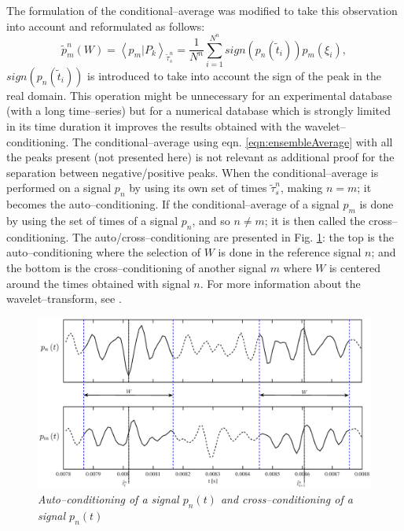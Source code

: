 The formulation of the conditional--average was modified to take this observation into account and reformulated as follows:
\begin{equation} \label{eqn:condAvgSign}
\tilde{p}_{m}^n\left( W \right) = \left< p_{m} | P_{k} \right>_{\tilde{\tau}^n_{s}} = \frac{1}{N^n} \sum^{N^n}_{i = 1} sign\left( p_{n} \left( \tilde{t}_{i} \right) \right) p_{m} \left( \xi_{i} \right),
\end{equation}
$sign\left( p_{n} \left( \tilde{t}_{i} \right) \right)$ is introduced to take into account the sign of the peak in the real domain. This operation might be unnecessary for an experimental database (with a long time--series) but for a numerical database which is strongly limited in its time duration it improves the results obtained with the wavelet--conditioning.
The conditional--average using eqn. \ref{eqn:ensembleAverage} with all the peaks present (not presented here) is not relevant as additional proof for the separation between negative/positive peaks.
When the conditional--average is performed on a signal $p_{n}$ by using its own set of times ${\tilde{\tau}^n_{s}}$, making $n = m$; it becomes the auto--conditioning. If the conditional--average of a signal $p_{m}$ is done by using the set of times of a signal $p_{n}$, and so $n \neq m$; it is then called the cross--conditioning. The auto/cross--conditioning are presented in Fig.  \ref{fig:condNcond}: the top is the auto--conditioning where the selection of $W$ is done in the reference signal $n$; and the bottom is the cross--conditioning of another signal $m$ where $W$ is centered around the times obtained with signal $n$. For more information about the wavelet--transform, see \cite{Farge1992}.
\begin{figure}
	\centering
	\includegraphics[width=1\textwidth]{Figures/condNcond.eps}
	\caption{\textit{Auto--conditioning of a signal $p_n(t)$ and cross--conditioning of a signal $p_n(t)$}}
	\label{fig:condNcond}
\end{figure}

